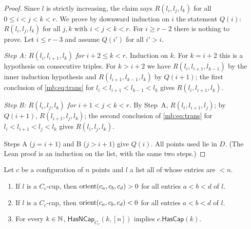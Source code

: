 \begin{proof}
Since $l$ is strictly increasing, the claim says $R(l_i,l_j,l_k)$ for all $0\le i<j<k<r$. We prove by downward induction
on $i$ the statement $Q(i)$: $R(l_i,l_j,l_k)$ for all $j,k$ with $i<j<k<r$. For $i\ge r-2$ there is nothing to prove.
Let $i\le r-3$ and assume $Q(i')$ for all $i'>i$.

\emph{Step A: $R(l_i,l_{i+1},l_k)$ for $i+2\le k<r$.} Induction on $k$. For $k=i+2$ this is a hypothesis on consecutive
triples. For $k>i+2$ we have $R(l_i,l_{i+1},l_{k-1})$ by the inner induction hypothesis and $R(l_{i+1},l_{k-1},l_k)$ by
$Q(i+1)$; the first conclusion of \eqref{mb:eq:trans} for $l_i<l_{i+1}<l_{k-1}<l_k$ gives $R(l_i,l_{i+1},l_k)$.

\emph{Step B: $R(l_i,l_j,l_k)$ for $i+1<j<k<r$.} By Step~A, $R(l_i,l_{i+1},l_j)$; by $Q(i+1)$, $R(l_{i+1},l_j,l_k)$;
the second conclusion of \eqref{mb:eq:trans} for $l_i<l_{i+1}<l_j<l_k$ gives $R(l_i,l_j,l_k)$.

Steps A ($j=i+1$) and B ($j>i+1$) give $Q(i)$. All points used lie in $D$. (The Lean proof is an induction on the list,
with the same two steps.)
\end{proof}

\begin{lemma}\label{mb:lem:lists}\raggedright
Let $c$ be a configuration of $n$ points and $l$ a list all of whose entries are $<n$.
\begin{enumerate}[label=(\alph*)]
\item If $l$ is a $C_c$-cup, then $\operatorname{orient}(c_a,c_b,c_d)>0$ for all entries $a<b<d$ of $l$.
\item If $l$ is a $C_c$-cap, then $\operatorname{orient}(c_a,c_b,c_d)<0$ for all entries $a<b<d$ of $l$.
\item For every $k\in\mathbb N$, $\mathsf{HasNCap}_{C_c}(k,[n])$ implies $c.\mathsf{HasCap}(k)$.
\end{enumerate}
\end{lemma}

